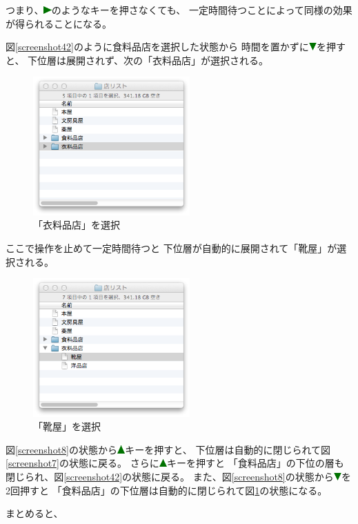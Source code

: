 \documentclass[twoside]{wiss}
\def\uptriangle{\includegraphics[width=3mm,bb=0 0 36 36]{figures/uptriangle.pdf}}
\def\downtriangle{\includegraphics[width=3mm,bb=0 0 36 36]{figures/downtriangle.pdf}}
\def\righttriangle{\includegraphics[width=3mm,bb=0 0 36 36]{figures/righttriangle.pdf}}
\begin{document}
\noindent
つまり、{\righttriangle}のようなキーを押さなくても、
一定時間待つことによって同様の効果が得られることになる。

図\ref{screenshot42}のように食料品店を選択した状態から
時間を置かずに{\downtriangle}を押すと、
下位層は展開されず、次の「衣料品店」が選択される。

\begin{figure}[H]
\centerline{\includegraphics[width=60mm,bb=0 0 344 304]{figures/c5c757d8f79d5a8a9c85eef25600ba66.png}}
\caption{「衣料品店」を選択}
\label{screenshot9}
\end{figure}

\noindent
ここで操作を止めて一定時間待つと
下位層が自動的に展開されて「靴屋」が選択される。

\begin{figure}[H]
\centerline{\includegraphics[width=60mm,bb=0 0 344 304]{figures/fddd5777d39924ea3f0220ae39a604c1.png}}
\caption{「靴屋」を選択}
\label{screenshot10}
\end{figure}

図\ref{screenshot8}の状態から{\uptriangle}キーを押すと、
下位層は自動的に閉じられて図\ref{screenshot7}の状態に戻る。 
さらに{\uptriangle}キーを押すと
「食料品店」の下位の層も閉じられ、図\ref{screenshot42}の状態に戻る。
%
また、図\ref{screenshot8}の状態から{\downtriangle}を2回押すと
「食料品店」の下位層は自動的に閉じられて図\ref{screenshot9}の状態になる。

まとめると、
\end{document}
